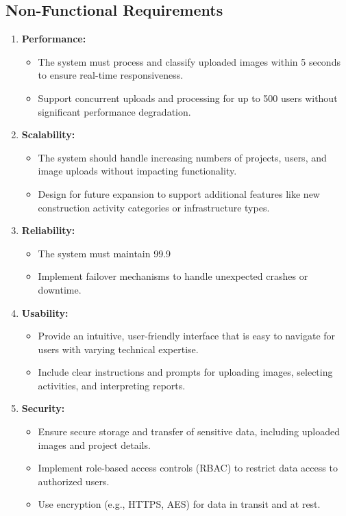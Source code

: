 \documentclass[12pt,a4paper]{report}
\begin{document}
\subsection{Non-Functional Requirements}
\begin{enumerate}
    \item \textbf{Performance:}
    \begin{itemize}
        \item The system must process and classify uploaded images within 5 seconds to ensure real-time responsiveness.
        \item Support concurrent uploads and processing for up to 500 users without significant performance degradation.
    \end{itemize}
    \item \textbf{Scalability:}
    \begin{itemize}
        \item The system should handle increasing numbers of projects, users, and image uploads without impacting functionality.
        \item Design for future expansion to support additional features like new construction activity categories or infrastructure types.
    \end{itemize}
    \item \textbf{Reliability:}
    \begin{itemize}
        \item The system must maintain 99.9%
        \item Implement failover mechanisms to handle unexpected crashes or downtime.
    \end{itemize}
    \item \textbf{Usability:}
    \begin{itemize}
        \item Provide an intuitive, user-friendly interface that is easy to navigate for users with varying technical expertise.
        \item Include clear instructions and prompts for uploading images, selecting activities, and interpreting reports.
    \end{itemize}
    \item \textbf{Security:}
    \begin{itemize}
        \item Ensure secure storage and transfer of sensitive data, including uploaded images and project details.
        \item Implement role-based access controls (RBAC) to restrict data access to authorized users.
        \item Use encryption (e.g., HTTPS, AES) for data in transit and at rest.
    \end{itemize}
\end{enumerate}
\end{document}

